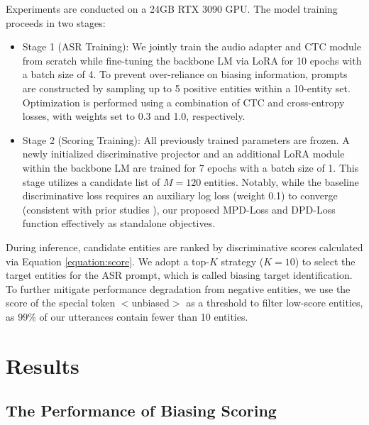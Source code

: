 \documentclass[cameraready]{Interspeech}
\begin{document}
Experiments are conducted on a 24GB RTX 3090 GPU. The model training proceeds in two stages:
%
\begin{itemize}
    \item
    Stage 1 (ASR Training): We jointly train the audio adapter and CTC module from scratch while fine-tuning the backbone LM via LoRA for 10 epochs with a batch size of 4.
    To prevent over-reliance on biasing information, prompts are constructed by sampling up to 5 positive entities within a 10-entity set.
    Optimization is performed using a combination of CTC and cross-entropy losses, with weights set to 0.3 and 1.0, respectively.
    \item
    Stage 2 (Scoring Training): All previously trained parameters are frozen. A newly initialized discriminative projector and an additional LoRA module within the backbone LM are trained for 7 epochs with a batch size of 1.
    This stage utilizes a candidate list of $M=120$ entities.
    Notably, while the baseline discriminative loss requires an auxiliary log loss (weight 0.1) to converge (consistent with prior studies \cite{huang2025neuralmodelcontextualbiasing}), our proposed MPD-Loss and DPD-Loss function effectively as standalone objectives.
\end{itemize}
%
During inference, candidate entities are ranked by discriminative scores calculated via Equation \ref{equation:score}.
%
We adopt a top-$K$ strategy ($K=10$) to select the target entities for the ASR prompt, which is called biasing target identification.
%
To further mitigate performance degradation from negative entities, we use the score of the special token $<$unbiased$>$ as a threshold to filter low-score entities, as 99\% of our utterances contain fewer than 10 entities.





\section{Results}
\subsection{The Performance of Biasing Scoring}
\end{document}
